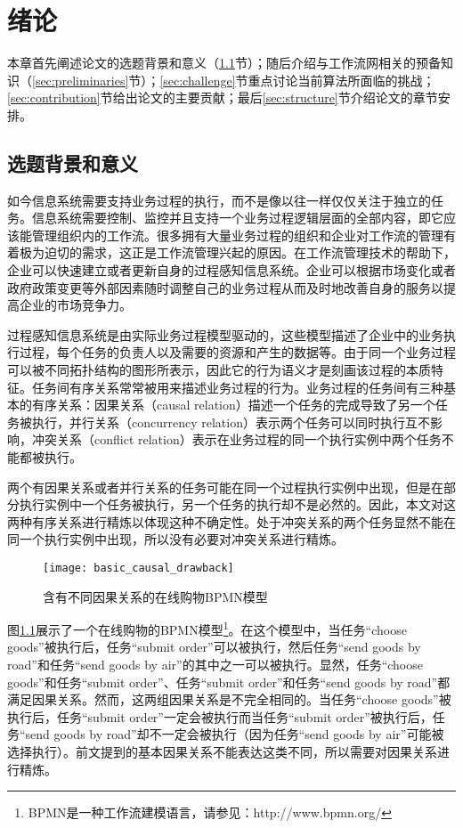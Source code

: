 \chapter{绪论}\label{cha:intro}
本章首先阐述论文的选题背景和意义（\ref{sec:background}节）；随后介绍与工作流网相关的预备知识（\ref{sec:preliminaries}节）；\ref{sec:challenge}节重点讨论当前算法所面临的挑战；\ref{sec:contribution}节给出论文的主要贡献；最后\ref{sec:structure}节介绍论文的章节安排。

\section{选题背景和意义}\label{sec:background}
如今信息系统需要支持业务过程的执行，而不是像以往一样仅仅关注于独立的任务。信息系统需要控制、监控并且支持一个业务过程逻辑层面的全部内容，即它应该能管理组织内的工作流。很多拥有大量业务过程的组织和企业对工作流的管理有着极为迫切的需求，这正是工作流管理兴起的原因\cite{van1998application}。在工作流管理技术的帮助下，企业可以快速建立或者更新自身的过程感知信息系统\cite{dumas2005process}。企业可以根据市场变化或者政府政策变更等外部因素随时调整自己的业务过程从而及时地改善自身的服务以提高企业的市场竞争力。

过程感知信息系统是由实际业务过程模型驱动的，这些模型描述了企业中的业务执行过程，每个任务的负责人以及需要的资源和产生的数据等。由于同一个业务过程可以被不同拓扑结构的图形所表示，因此它的行为语义才是刻画该过程的本质特征。任务间有序关系\cite{esparza2002improvement}常常被用来描述业务过程的行为。业务过程的任务间有三种基本的有序关系：因果关系（causal relation）描述一个任务的完成导致了另一个任务被执行，并行关系（concurrency relation）表示两个任务可以同时执行互不影响，冲突关系（conflict relation）表示在业务过程的同一个执行实例中两个任务不能都被执行。

两个有因果关系或者并行关系的任务可能在同一个过程执行实例中出现，但是在部分执行实例中一个任务被执行，另一个任务的执行却不是必然的。因此，本文对这两种有序关系进行精炼以体现这种不确定性。处于冲突关系的两个任务显然不能在同一个执行实例中出现，所以没有必要对冲突关系进行精炼。

\begin{figure}[htbp]
  \centering
  \texttt{[image: basic\_causal\_drawback]}
  \caption{含有不同因果关系的在线购物BPMN模型\label{fig:basic_causal_drawback}}
\end{figure}

\begin{example}\label{ex:basic_causal_drawback}
图\ref{fig:basic_causal_drawback}展示了一个在线购物的BPMN模型\footnote{BPMN是一种工作流建模语言，请参见：http://www.bpmn.org/}。在这个模型中，当任务“choose goods”被执行后，任务“submit order”可以被执行，然后任务“send goods by road”和任务“send goods by air”的其中之一可以被执行。显然，任务“choose goods”和任务“submit order”、任务“submit order”和任务“send goods by road”都满足因果关系。然而，这两组因果关系是不完全相同的。当任务“choose goods”被执行后，任务“submit order”一定会被执行而当任务“submit order”被执行后，任务“send goods by road”却不一定会被执行（因为任务“send goods by air”可能被选择执行）。前文提到的基本因果关系不能表达这类不同，所以需要对因果关系进行精炼。
\end{example}

